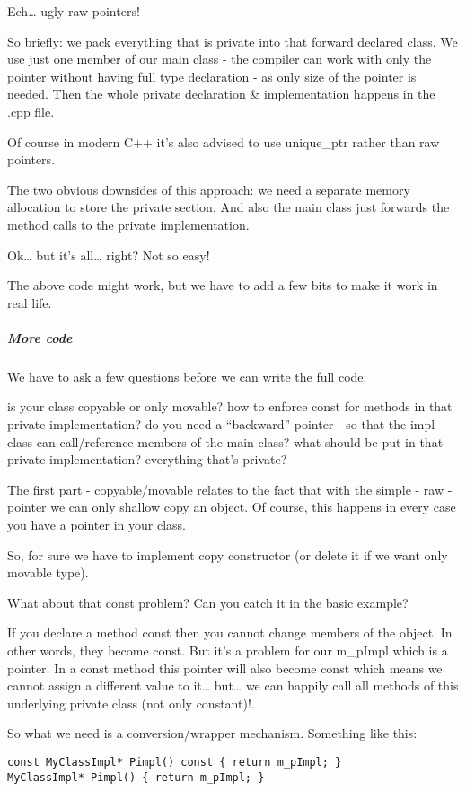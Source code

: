 \documentclass{book}
\begin{document}
Ech… ugly raw pointers!

So briefly: we pack everything that is private into that forward declared class. 
We use just one member of our main class - the compiler can work with only the pointer without having full type declaration - as only size of the pointer is needed. 
Then the whole private declaration \& implementation happens in the .cpp file.

Of course in modern C++ it’s also advised to use unique\_ptr rather than raw pointers.

The two obvious downsides of this approach: we need a separate memory allocation to store the private section. And also the main class just forwards the method calls to the private implementation.

Ok… but it’s all… right? Not so easy!

The above code might work, but we have to add a few bits to make it work in real life.
\subparagraph{More code}

We have to ask a few questions before we can write the full code:

    is your class copyable or only movable?
    how to enforce const for methods in that private implementation?
    do you need a “backward” pointer - so that the impl class can call/reference members of the main class?
    what should be put in that private implementation? everything that’s private?

The first part - copyable/movable relates to the fact that with the simple - raw - pointer we can only shallow copy an object. Of course, this happens in every case you have a pointer in your class.

So, for sure we have to implement copy constructor (or delete it if we want only movable type).

What about that const problem? Can you catch it in the basic example?

If you declare a method const then you cannot change members of the object. In other words, they become const. But it’s a problem for our m\_pImpl which is a pointer. 
In a const method this pointer will also become const which means we cannot assign a different value to it… but… we can happily call all methods of this underlying private class (not only constant)!.

So what we need is a conversion/wrapper mechanism. Something like this:

\begin{lstlisting}
const MyClassImpl* Pimpl() const { return m_pImpl; }
MyClassImpl* Pimpl() { return m_pImpl; }
\end{lstlisting}
\end{document}
